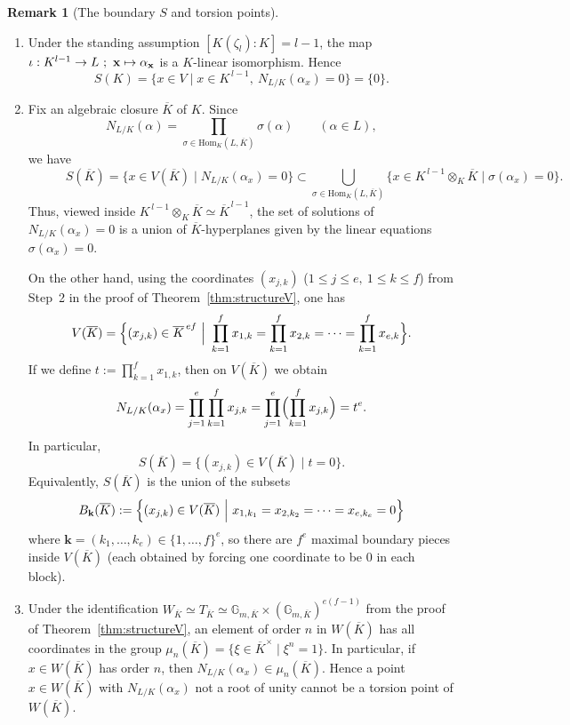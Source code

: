 \documentclass[a4paper, 11pt]{amsart}
\newcommand{\Hom}{\mathrm{Hom}}
\theoremstyle{plain}
\theoremstyle{definition}
\newtheorem{remark}[thm]{Remark}
\numberwithin{equation}{section}
\begin{document}
\begin{remark}[The boundary $S$ and torsion points]\label{rem:boundary-torsion}
\quad \\
\begin{enumerate}
\item
Under the standing assumption $[K(\zeta_l):K]=l-1$, the map
$\iota : K^{l-1}\to L\ ;\ {\bf x}\mapsto \alpha_{\bf x}$ is a $K$-linear isomorphism.
Hence
\[
S(K)=\{x\in V\mid x\in K^{\,l-1},\ N_{L/K}(\alpha_x)=0\}=\{0\}.
\]

\item
Fix an algebraic closure $ \overline{K}$ of $K$. Since
\[
N_{L/K}(\alpha)=\prod_{\sigma\in\Hom_K(L, \overline{K})}\sigma(\alpha)
\qquad(\alpha\in L),
\]
we have
\[
\quad \quad \quad S( \overline{K})=\{x\in V( \overline{K})\mid N_{L/K}(\alpha_x)=0\}
\subset
\bigcup_{\sigma\in\Hom_K(L, \overline{K})}\{x\in K^{\,l-1}\otimes_K \overline{K}\mid \sigma(\alpha_x)=0\}.
\]
Thus, viewed inside $K^{\,l-1}\otimes_K \overline{K}\simeq  \overline{K}^{\,l-1}$, the set of
solutions of $N_{L/K}(\alpha_x)=0$ is a union of $ \overline{K}$-hyperplanes given by the
linear equations $\sigma(\alpha_x)=0$.

On the other hand, using the coordinates $(x_{j,k})$ ($1\le j\le e,\ 1\le k\le f$)
from Step~2 in the proof of Theorem~\ref{thm:structureV}, one has
\[
V( \overline{K})=
\Bigl\{(x_{j,k})\in  \overline{K}^{\,ef}\ \Big|\ \prod_{k=1}^f x_{1,k}
=\prod_{k=1}^f x_{2,k}
=\cdots
=\prod_{k=1}^f x_{e,k}\Bigr\}.
\]
If we define $t:=\prod_{k=1}^f x_{1,k}$, then on $V( \overline{K})$ we obtain
\[
N_{L/K}(\alpha_x)=\prod_{j=1}^e\prod_{k=1}^f x_{j,k}
=\prod_{j=1}^e\Bigl(\prod_{k=1}^f x_{j,k}\Bigr)=t^e.
\]
In particular,
\[
S( \overline{K})=\{(x_{j,k})\in V( \overline{K})\mid t=0\}.
\]
Equivalently, $S( \overline{K})$ is the union of the subsets
\[
B_{\mathbf k}( \overline{K}):=
\Bigl\{(x_{j,k})\in V( \overline{K})\ \Big|\ x_{1,k_1}=x_{2,k_2}=\cdots=x_{e,k_e}=0\Bigr\}
\]
where $\mathbf k=(k_1,\dots,k_e)\in\{1,\dots,f\}^e$,
so there are $f^e$ maximal boundary pieces inside $V( \overline{K})$ (each obtained by
forcing one coordinate to be $0$ in each block).

\item
Under the identification $W_{ \overline{K}}\simeq T_{ \overline{K}}\simeq
\mathbb{G}_{m, \overline{K}}\times(\mathbb{G}_{m, \overline{K}})^{e(f-1)}$ from the proof of Theorem~\ref{thm:structureV},
an element of order $n$ in $W( \overline{K})$ has all coordinates in the group
$\mu_n( \overline{K})=\{\xi\in \overline{K}^\times\mid \xi^n=1\}$.
In particular, if $x\in W( \overline{K})$ has order $n$, then $N_{L/K}(\alpha_x)\in \mu_n( \overline{K})$.
Hence a point $x\in W( \overline{K})$ with $N_{L/K}(\alpha_x)$ not a root of unity
cannot be a torsion point of $W( \overline{K})$.


\end{enumerate}
\end{remark}
\end{document}
